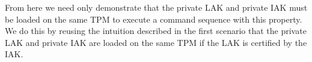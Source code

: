 \documentclass[runningheads]{llncs}
\begin{document}


From here we need only demonstrate that the private LAK and private IAK
must be loaded on the same TPM to execute a command sequence with this property.
We do this by reusing the intuition described in the first scenario that
the private LAK and private IAK are loaded on the same TPM if the LAK
is certified by the IAK.
\end{document}
